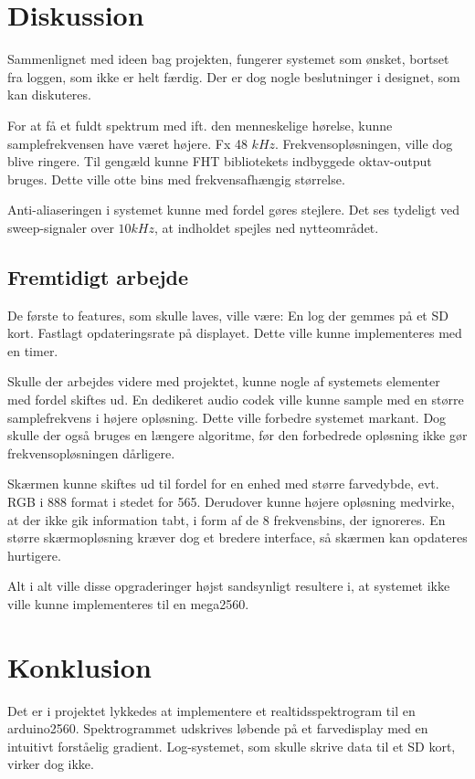 \section{Diskussion}
Sammenlignet med ideen bag projekten, fungerer systemet som ønsket, bortset fra loggen, som ikke er helt færdig. 
Der er dog nogle beslutninger i designet, som kan diskuteres. 

For at få et fuldt spektrum med ift. den menneskelige hørelse, kunne samplefrekvensen have været højere. 
Fx 48 $kHz$. 
Frekvensopløsningen, ville dog blive ringere. Til gengæld kunne FHT bibliotekets indbyggede oktav-output bruges. Dette ville otte bins med frekvensafhængig størrelse.

Anti-aliaseringen i systemet kunne med fordel gøres stejlere. Det ses tydeligt ved sweep-signaler over $10 kHz$, at indholdet spejles ned nytteområdet. 

\subsection{Fremtidigt arbejde}
De første to features, som skulle laves, ville være:
En log der gemmes på et SD kort.
Fastlagt opdateringsrate på displayet. Dette ville kunne implementeres med en timer. 

Skulle der arbejdes videre med projektet, kunne nogle af systemets elementer med fordel skiftes ud. 
En dedikeret audio codek ville kunne sample med en større samplefrekvens i højere opløsning. 
Dette ville forbedre systemet markant. 
Dog skulle der også bruges en længere algoritme, før den forbedrede opløsning ikke gør frekvensopløsningen dårligere.

Skærmen kunne skiftes ud til fordel for en enhed med større farvedybde, evt. RGB i 888 format i stedet for 565. 
Derudover kunne højere opløsning medvirke, at der ikke gik information tabt, i form af de 8 frekvensbins, der ignoreres. 
En større skærmopløsning kræver dog et bredere interface, så skærmen kan opdateres hurtigere. 

Alt i alt ville disse opgraderinger højst sandsynligt resultere i, at systemet ikke ville kunne implementeres til en mega2560.

\section{Konklusion}
Det er i projektet lykkedes at implementere et realtidsspektrogram til en arduino2560. 
Spektrogrammet udskrives løbende på et farvedisplay med en intuitivt forståelig gradient.  
Log-systemet, som skulle skrive data til et SD kort, virker dog ikke. 

